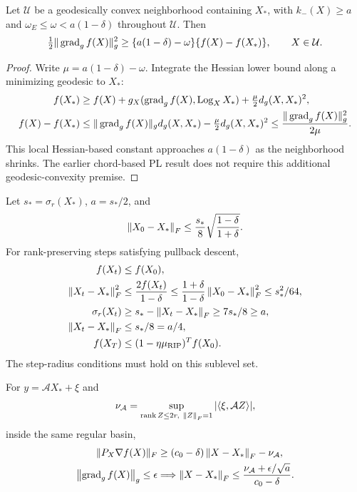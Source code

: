 \begin{corollary}
Let $\mathcal U$ be a geodesically convex neighborhood containing
$X_*$, with $k_-(X)\geq a$ and
$\omega_E\leq\omega<a(1-\delta)$ throughout $\mathcal U$.
Then
\begin{equation}
\tfrac12\|\operatorname{grad}_g f(X)\|_g^2
\geq\{a(1-\delta)-\omega\}\{f(X)-f(X_*)\},
\qquad X\in\mathcal U .
\end{equation}
\end{corollary}
\begin{proof}
Write $\mu=a(1-\delta)-\omega$.
Integrate the Hessian lower bound along a minimizing geodesic to $X_*$:
\begin{align}
f(X_*)&\geq f(X)+g_X(\operatorname{grad}_g f(X),\operatorname{Log}_XX_*)
+\tfrac\mu2d_g(X,X_*)^2,\\
f(X)-f(X_*)&\leq\|\operatorname{grad}_g f(X)\|_g d_g(X,X_*)
-\tfrac\mu2d_g(X,X_*)^2
\leq\frac{\|\operatorname{grad}_g f(X)\|_g^2}{2\mu}.
\end{align}
This local Hessian-based constant approaches $a(1-\delta)$ as the
neighborhood shrinks. The earlier chord-based PL result does not
require this additional geodesic-convexity premise.
\end{proof}

\begin{corollary}
Let $s_*=\sigma_r(X_*)$, $a=s_*/2$, and
\begin{equation}
\left\lVert X_0-X_*\right\rVert_F\leq\frac{s_*}{8}
\sqrt{\frac{1-\delta}{1+\delta}} .
\end{equation}
For rank-preserving steps satisfying pullback descent,
\begin{align}
f(X_t)&\leq f(X_0),\\
\left\lVert X_t-X_*\right\rVert_F^2
&\leq\frac{2f(X_t)}{1-\delta}
\leq\frac{1+\delta}{1-\delta}\left\lVert X_0-X_*\right\rVert_F^2
\leq s_*^2/64,\\
\sigma_r(X_t)&\geq s_*-\left\lVert X_t-X_*\right\rVert_F\geq7s_*/8\geq a,\\
\left\lVert X_t-X_*\right\rVert_F&\leq s_*/8=a/4,\\
f(X_T)&\leq(1-\eta\mu_{\rm RIP})^T f(X_0).
\end{align}
The step-radius conditions must hold on this sublevel set.
\end{corollary}

\begin{corollary}
For $y=\mathcal AX_*+\xi$ and
\begin{equation}
\nu_{\mathcal A}=\sup_{\rnk Z\leq2r,\ \nn Z=1}
|\langle\xi,\mathcal AZ\rangle|,
\end{equation}
inside the same regular basin,
\begin{align}
\|P_X\nabla f(X)\|_F
&\geq(c_0-\delta)\left\lVert X-X_*\right\rVert_F-\nu_{\mathcal A},\\
\left\lVert\operatorname{grad}_g f(X)\right\rVert_g\leq\epsilon
&\Longrightarrow
\left\lVert X-X_*\right\rVert_F
\leq\frac{\nu_{\mathcal A}+\epsilon/\sqrt a}{c_0-\delta}.
\label{eq:rigid-noisy-reconstruction}
\end{align}
\end{corollary}

